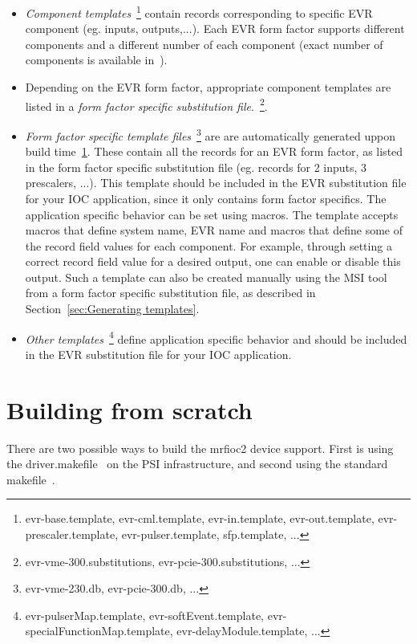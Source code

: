 \documentclass[12pt,a4paper]{article}
\let\stdsection\section
\renewcommand\section{\newpage\stdsection}
\begin{document}
\begin{itemize}
	\item 
		\emph{Component templates}~\footnote{evr-base.template, evr-cml.template, evr-in.template, evr-out.template, evr-prescaler.template, evr-pulser.template, sfp.template, ...} contain records corresponding to specific EVR component (eg. inputs, outputs,...). Each EVR form factor supports different components and a different number of each component (exact number of components is available in~\cite{mrm_evr}).
	\item 
		Depending on the EVR form factor, appropriate component templates are listed in a \emph{form factor specific substitution file}.~\footnote{evr-vme-300.substitutions, evr-pcie-300.substitutions, ...}. 
	\item 
		\emph{Form factor specific template files}~\footnote{evr-vme-230.db, evr-pcie-300.db, ...} are are automatically generated uppon build time~\ref{sec:Building from scratch}. These contain all the records for an EVR form factor, as listed in the form factor specific substitution file (eg. records for 2 inputs, 3 prescalers, ...). This template should be included in the EVR substitution file for your IOC application, since it only contains form factor specifics. The application specific behavior can be set using macros. The template accepts macros that define system name, EVR name and macros that define some of the record field values for each component. For example, through setting a correct record field value for a desired output, one can enable or disable this output. Such a template can also be created manually using the MSI tool from a form factor specific substitution file, as described in Section~\ref{sec:Generating templates}.
	\item 
		\emph{Other templates}~\footnote{evr-pulserMap.template, evr-softEvent.template, evr-specialFunctionMap.template, evr-delayModule.template, ...} define application specific behavior and should be included in the EVR substitution file for your IOC application.
\end{itemize}

\section{Building from scratch}\label{sec:Building from scratch}
There are two possible ways to build the mrfioc2 device support. First is using the driver.makefile~\cite{driver.makefile} on the PSI infrastructure, and second using the standard makefile~\cite{appDevGuide}.
\end{document}
